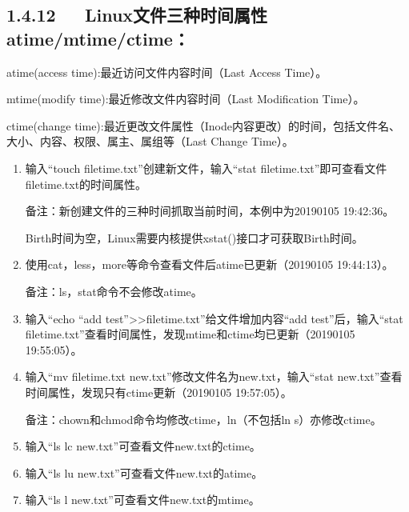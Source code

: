 \documentclass[letterpaper,12pt,english]{sphinxmanual}
\begin{document}
\subsection{1.4.12   Linux文件三种时间属性atime/mtime/ctime：}
\label{\detokenize{001software/001install/linux:linuxatime-mtime-ctime}}
atime(access time):最近访问文件内容时间（Last Access Time）。

mtime(modify time):最近修改文件内容时间（Last Modification Time）。

ctime(change time):最近更改文件属性（Inode内容更改）的时间，包括文件名、大小、内容、权限、属主、属组等（Last Change Time）。
\begin{enumerate}
%
\item {} 
输入“touch filetime.txt”创建新文件，输入“stat filetime.txt”即可查看文件filetime.txt的时间属性。

备注：新创建文件的三种时间抓取当前时间，本例中为2019\sphinxhyphen{}01\sphinxhyphen{}05 19:42:36。

Birth时间为空，Linux需要内核提供xstat()接口才可获取Birth时间。

\item {} 
使用cat，less，more等命令查看文件后atime已更新（2019\sphinxhyphen{}01\sphinxhyphen{}05 19:44:13）。

备注：ls，stat命令不会修改atime。

\item {} 
输入“echo “add test”>>filetime.txt”给文件增加内容“add test”后，输入“stat filetime.txt”查看时间属性，发现mtime和ctime均已更新（2019\sphinxhyphen{}01\sphinxhyphen{}05 19:55:05）。

\item {} 
输入“mv filetime.txt new.txt”修改文件名为new.txt，输入“stat new.txt”查看时间属性，发现只有ctime更新（2019\sphinxhyphen{}01\sphinxhyphen{}05 19:57:05）。

备注：chown和chmod命令均修改ctime，ln（不包括ln \sphinxhyphen{}s）亦修改ctime。

\item {} 
输入“ls \sphinxhyphen{}lc new.txt”可查看文件new.txt的ctime。

\item {} 
输入“ls \sphinxhyphen{}lu new.txt”可查看文件new.txt的atime。

\item {} 
输入“ls \sphinxhyphen{}l new.txt”可查看文件new.txt的mtime。

\end{enumerate}
\end{document}
